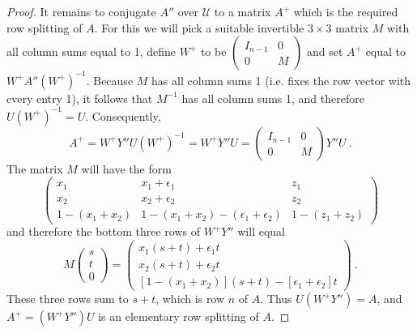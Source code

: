 \documentclass{amsart}
\theoremstyle{definition}
\theoremstyle{remark}
\numberwithin{equation}{section}
\begin{document}
{{\begin{proof}
It remains to conjugate $A''$ over $\mathcal U$ to a 
matrix 
$A^+$ which is the required row splitting of $A$. 
 For this we will pick a suitable invertible 
 $3\times 3$ matrix $M$ with all column sums equal to 1, define  
$W^+$ to be $\begin{pmatrix} I_{n-1} & 0 \\ 0 &M\end{pmatrix}$ 
and set $A^+$ equal to $W^+ A''(W^+)^{-1} $. 
Because $M$ has all column sums 1 (i.e. fixes the row vector with 
every entry 1), it follows that $M^{-1}$ has all column sums 1, and therefore 
$U(W^+)^{-1}=U$. Consequently, 
\[
A^+  =  W^+ Y''U(W^+)^{-1}  =  W^+ Y''U
= 
\begin{pmatrix} I_{n-1} & 0   \\  0 & M 
\end{pmatrix} Y''
U  \ . 
\]
The matrix $M$ will have the form 
\begin{equation}\label{Mdefn}
\begin{pmatrix} 
x_1 & x_1 + \epsilon_1 & z_1 \\
x_2 & x_2 + \epsilon_2 & z_2 \\
1-(x_1+x_2) & 1-(x_1+x_2)-(\epsilon_1+\epsilon_2) & 1-(z_1+z_2)
\end{pmatrix} 
\end{equation}
and therefore the bottom three rows of $W^+Y''$ will equal 
\begin{equation}\label{onethird}
M 
\begin{pmatrix} s \\ t\\ 0 
\end{pmatrix} 
= 
\begin{pmatrix} 
x_1(s+t) + \epsilon_1t \\ 
x_2(s+t) + \epsilon_2t \\ 
[1- (x_1+x_2)](s+t) - [\epsilon_1+\epsilon_2]t  
\end{pmatrix} \ . 
\end{equation}  
These three rows  sum to $s+t$, 
which is row $n$ of $A$. Thus $U(W^+Y'')=A$, and 
$A^+=(W^+Y'')U$ is an elementary 
row splitting of $A$. 


\end{proof}}}
\end{document}

